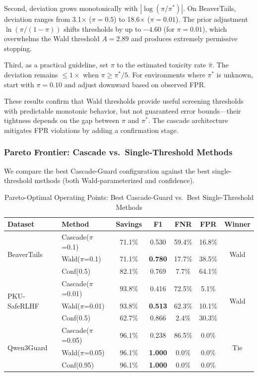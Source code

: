 \documentclass[acmtjournal, acmnowidth]{acmart}
\theoremstyle{definition}
\begin{document}
Second, deviation grows monotonically with $|\log(\pi/\pi^*)|$. On BeaverTails, deviation ranges from 3.1$\times$ ($\pi = 0.5$) to 18.6$\times$ ($\pi = 0.01$). The prior adjustment $\ln(\pi/(1{-}\pi))$ shifts thresholds by up to $-4.60$ (for $\pi = 0.01$), which overwhelms the Wald threshold $A = 2.89$ and produces extremely permissive stopping.

Third, as a practical guideline, set $\pi$ to the estimated toxicity rate $\hat{\pi}$. The deviation remains $\leq 1\times$ when $\pi \geq \pi^*/5$. For environments where $\pi^*$ is unknown, start with $\pi = 0.10$ and adjust downward based on observed FPR.

These results confirm that Wald thresholds provide useful screening thresholds with predictable monotonic behavior, but not guaranteed error bounds---their tightness depends on the gap between $\pi$ and $\pi^*$. The cascade architecture mitigates FPR violations by adding a confirmation stage.

\subsubsection{Pareto Frontier: Cascade vs.\ Single-Threshold Methods}
\label{sec:pareto_comparison}

We compare the best Cascade-Guard configuration against the best single-threshold methods (both Wald-parameterized and confidence).

\begin{table}[h]
\caption{Pareto-Optimal Operating Points: Best Cascade-Guard vs.\ Best Single-Threshold Methods}
\label{tab:pareto}
\begin{tabular}{llccccc}
\toprule
Dataset & Method & Savings & F1 & FNR & FPR & Winner \\
\midrule
\multirow{3}{*}{BeaverTails}
 & Cascade($\pi$=0.1) & 71.1\% & 0.530 & 59.4\% & 16.8\% & \multirow{3}{*}{Wald} \\
 & Wald($\pi$=0.1) & 71.1\% & \textbf{0.780} & 17.7\% & 38.5\% & \\
 & Conf(0.5) & 82.1\% & 0.769 & 7.7\% & 64.1\% & \\
\midrule
\multirow{3}{*}{PKU-SafeRLHF}
 & Cascade($\pi$=0.01) & 93.8\% & 0.416 & 72.5\% & 5.1\% & \multirow{3}{*}{Wald} \\
 & Wald($\pi$=0.01) & 93.8\% & \textbf{0.513} & 62.3\% & 10.1\% & \\
 & Conf(0.5) & 62.7\% & 0.866 & 2.4\% & 30.3\% & \\
\midrule
\multirow{3}{*}{Qwen3Guard}
 & Cascade($\pi$=0.05) & 96.1\% & 0.238 & 86.5\% & 0.0\% & \multirow{3}{*}{Tie} \\
 & Wald($\pi$=0.05) & 96.1\% & \textbf{1.000} & 0.0\% & 0.0\% & \multirow{3}{*}{Tie} \\
 & Conf(0.95) & 96.1\% & \textbf{1.000} & 0.0\% & 0.0\% & \\
\bottomrule
\end{tabular}
\end{table}
\end{document}
